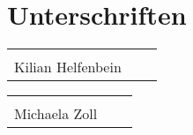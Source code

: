 
\section*{Unterschriften}

\vspace*{1 cm}

\begin{tabular}{p{7cm}p{.5cm}l}
	\dotfill \\ 
	Kilian Helfenbein
\end{tabular}%
\hfill
\begin{tabular}{p{7cm}p{.5cm}l}
	\dotfill \\ 
	Michaela Zoll
\end{tabular}